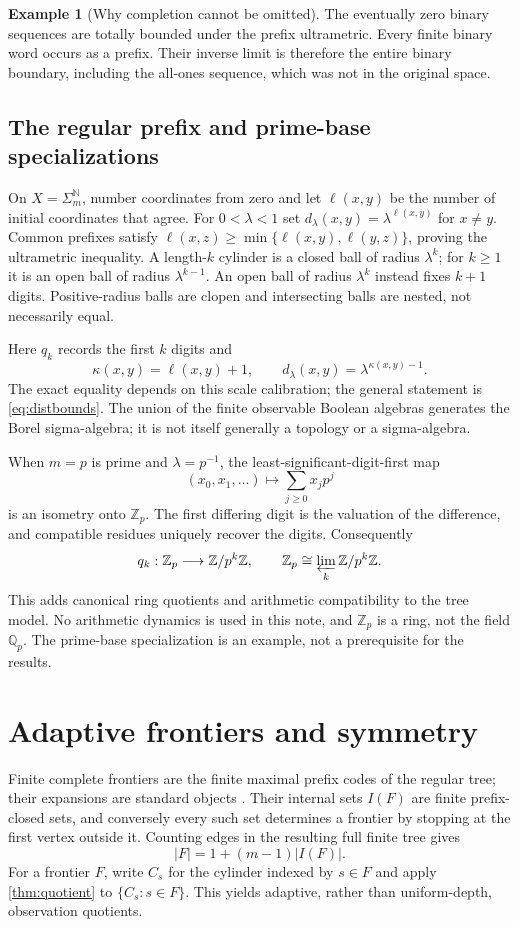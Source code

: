 \documentclass[11pt]{article}
\theoremstyle{definition}
\newtheorem{example}[theorem]{Example}
\theoremstyle{remark}
\newcommand{\N}{\mathbb N}
\newcommand{\Z}{\mathbb Z}
\begin{document}
\begin{example}[Why completion cannot be omitted]
The eventually zero binary sequences are totally bounded under the prefix ultrametric. Every finite binary word occurs as a prefix. Their inverse limit is therefore the entire binary boundary, including the all-ones sequence, which was not in the original space.
\end{example}

\subsection{The regular prefix and prime-base specializations}
On $X=\Sigma_m^{\N}$, number coordinates from zero and let $\ell(x,y)$ be the number of initial coordinates that agree. For $0<\lambda<1$ set $d_\lambda(x,y)=\lambda^{\ell(x,y)}$ for $x\ne y$. Common prefixes satisfy
$\ell(x,z)\geq\min\{\ell(x,y),\ell(y,z)\}$, proving the ultrametric inequality.
A length-$k$ cylinder is a closed ball of radius $\lambda^k$; for $k\geq1$ it is an open ball of radius $\lambda^{k-1}$. An open ball of radius $\lambda^k$ instead fixes $k+1$ digits. Positive-radius balls are clopen and intersecting balls are nested, not necessarily equal.

Here $q_k$ records the first $k$ digits and
\[
 \kappa(x,y)=\ell(x,y)+1,\qquad
 d_\lambda(x,y)=\lambda^{\kappa(x,y)-1}.
\]
The exact equality depends on this scale calibration; the general statement is \eqref{eq:distbounds}. The union of the finite observable Boolean algebras generates the Borel sigma-algebra; it is not itself generally a topology or a sigma-algebra.

When $m=p$ is prime and $\lambda=p^{-1}$, the least-significant-digit-first map
\[
 (x_0,x_1,\ldots)\longmapsto\sum_{j\geq0}x_jp^j
\]
is an isometry onto $\Z_p$. The first differing digit is the valuation of the difference, and compatible residues uniquely recover the digits. Consequently
\[
 q_k:\Z_p\longrightarrow\Z/p^k\Z,
 \qquad \Z_p\cong\varprojlim_k\Z/p^k\Z.
\]
This adds canonical ring quotients and arithmetic compatibility to the tree model. No arithmetic dynamics is used in this note, and $\Z_p$ is a ring, not the field $\mathbb Q_p$. The prime-base specialization is an example, not a prerequisite for the results.

\section{Adaptive frontiers and symmetry}\label{sec:symmetry}
Finite complete frontiers are the finite maximal prefix codes of the regular tree; their expansions are standard objects \cite{LawsonVdovina}. Their internal sets $I(F)$ are finite prefix-closed sets, and conversely every such set determines a frontier by stopping at the first vertex outside it. Counting edges in the resulting full finite tree gives
\begin{equation}\label{eq:leafcount}
 |F|=1+(m-1)|I(F)|.
\end{equation}
For a frontier $F$, write $C_s$ for the cylinder indexed by $s\in F$ and apply \cref{thm:quotient} to $\{C_s:s\in F\}$. This yields adaptive, rather than uniform-depth, observation quotients.
\end{document}

